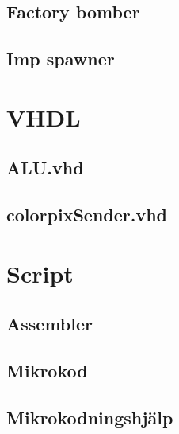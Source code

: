\documentclass[11pt]{article}
\begin{document}
\subsection{Factory bomber}


\subsection{Imp spawner}




\newpage
\section{VHDL}

\subsection{ALU.vhd}


\newpage
\subsection{colorpixSender.vhd}





\newpage
\section{Script}

\subsection{Assembler}


\newpage
\subsection{Mikrokod}


\newpage
\subsection{Mikrokodningshjälp}

\end{document}
